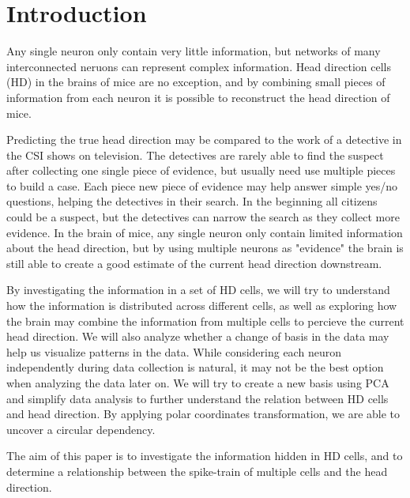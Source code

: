 \section{Introduction}
Any single neuron only contain very little information, but networks of many interconnected neruons can represent complex information. Head direction cells (HD) in the brains of mice are no exception, and by combining small pieces of information from each neuron it is possible to reconstruct the head direction of mice.

Predicting the true head direction may be compared to the work of a detective in the CSI shows on television. The detectives are rarely able to find the suspect after collecting one single piece of evidence, but usually need use multiple pieces to build a case. Each piece new piece of evidence may help answer simple yes/no questions, helping the detectives in their search. In the beginning all citizens could be a suspect, but the detectives can narrow the search as they collect more evidence. In the brain of mice, any single neuron only contain limited information about the head direction, but by using multiple neurons as "evidence" the brain is still able to create a good estimate of the current head direction downstream.  

By investigating the information in a set of HD cells, we will try to understand how the information is distributed across different cells, as well as exploring how the brain may combine the information from multiple cells to percieve the current head direction.
We will also analyze whether a change of basis in the data may help us visualize patterns in the data. While considering each neuron independently during data collection is natural, it may not be the best option when analyzing the data later on. We will try to create a new basis using PCA and simplify data analysis to further understand the relation between HD cells and head direction. By applying polar coordinates transformation, we are able to uncover a circular dependency.

The aim of this paper is to investigate the information hidden in HD cells, and to determine a relationship between the spike-train of multiple cells and the head direction.


